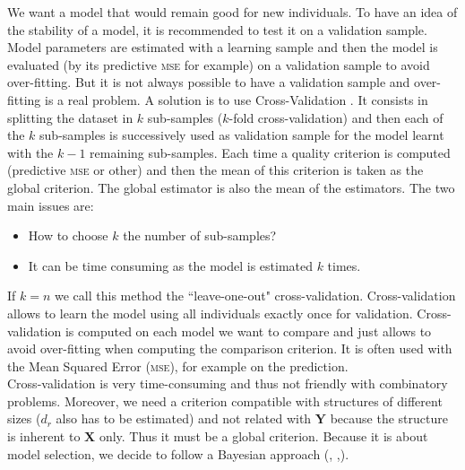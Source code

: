 \documentclass[12pt,a4paper]{report}
\begin{document}
				We want a model that would remain good for new individuals. To have an idea of the stability of a model, it is recommended to test it on a validation sample. Model parameters are estimated with a learning sample and then the model is evaluated (by its predictive \textsc{mse} for example) on a validation sample to avoid over-fitting. But it is not always possible to have a validation sample and over-fitting is a real problem. A solution is to use Cross-Validation \cite{kohavi1995study,arlot2010survey}. It consists in splitting the dataset in $k$ sub-samples ($k$-fold cross-validation) and then each of the $k$ sub-samples is successively used as validation sample for the model learnt with the $k-1$ remaining sub-samples. Each time a quality criterion  is computed (predictive \textsc{mse} or other) and then the mean of this criterion is taken as the global criterion. The global estimator is also the mean of the estimators. The two main issues are:
				\begin{itemize}
					\item How to choose $k$ the number of sub-samples?
					\item It can be time consuming as the model is estimated $k$ times.
				\end{itemize}
				If $k=n$ we call this method the ``leave-one-out" cross-validation.
				Cross-validation allows to learn the model using all individuals exactly once for validation.
				Cross-validation is computed on each model we want to compare and just allows to avoid over-fitting when computing the comparison criterion.
				It is often used with the Mean Squared Error (\textsc{mse}), for example on the prediction.\\
				
Cross-validation is very time-consuming and thus not friendly with combinatory problems. Moreover, we need a criterion compatible with structures of different sizes ($d_r$ also has to be estimated) and not related with $\boldsymbol{Y}$ because the structure is inherent to $\boldsymbol{X}$ only. Thus it must be a global criterion. 	
Because it is about model selection, we decide to follow a Bayesian approach (\cite{raftery1995bayesian}, \cite{andrieu1999joint},\cite{chipman2001practical}).  
	
\end{document}
